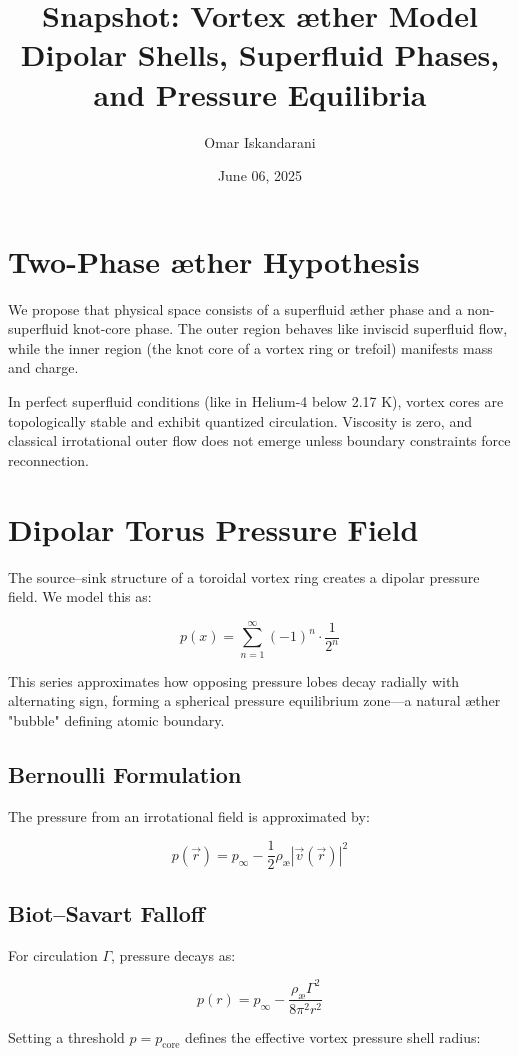 \documentclass[12pt]{article}
\title{Snapshot: Vortex \ae ther Model\\
\large Dipolar Shells, Superfluid Phases, and Pressure Equilibria}
\author{Omar Iskandarani}
\date{June 06, 2025}
\begin{document}
\maketitle

\section{Two-Phase \ae ther Hypothesis}
We propose that physical space consists of a superfluid \ae ther phase and a non-superfluid knot-core phase. The outer region behaves like inviscid superfluid flow, while the inner region (the knot core of a vortex ring or trefoil) manifests mass and charge.

In perfect superfluid conditions (like in Helium-4 below 2.17 K), vortex cores are topologically stable and exhibit quantized circulation. Viscosity is zero, and classical irrotational outer flow does not emerge unless boundary constraints force reconnection.

\section{Dipolar Torus Pressure Field}
The source–sink structure of a toroidal vortex ring creates a dipolar pressure field. We model this as:

\[
p(x) = \sum_{n=1}^{\infty} (-1)^n \cdot \frac{1}{2^n}
\]

This series approximates how opposing pressure lobes decay radially with alternating sign, forming a spherical pressure equilibrium zone—a natural \ae ther "bubble" defining atomic boundary.

\subsection{Bernoulli Formulation}
The pressure from an irrotational field is approximated by:

\[
p(\vec{r}) = p_\infty - \frac{1}{2} \rho_\text{\ae} |\vec{v}(\vec{r})|^2
\]

\subsection{Biot–Savart Falloff}
For circulation \( \Gamma \), pressure decays as:

\[
p(r) = p_\infty - \frac{\rho_\text{\ae} \Gamma^2}{8\pi^2 r^2}
\]

Setting a threshold \( p = p_\text{core} \) defines the effective vortex pressure shell radius:
\end{document}
